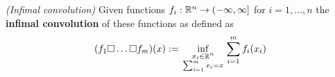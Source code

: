 
\begin{definition}
  \emph{(Infimal convolution)}
  Given functions
  $
    f_i:
    \mathbb{R}^n \to (-\infty, \infty]
  $
  for $ i = 1, \ldots, n $
  the \textbf{infimal convolution} of these functions as defined as
  \begin{gather}
    (f_1 \square \ldots \square f_m)(x)
    :=
    \inf_{
    \begin{smallmatrix}
      x_i \in \mathbb{R}^n \\
      \sum_{i = 1}^{m} 
        x_i
      =
      x
    \end{smallmatrix}
    }
    \sum_{i = 1}^{m}
      f_i(x_i)
  \end{gather}
\end{definition}


